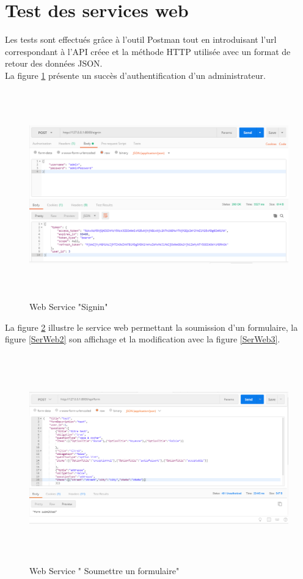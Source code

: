 \section{Test des services web}
Les tests sont effectués grâce à l'outil Postman tout en introduisant l'url correspondant à l'API créee et la méthode HTTP utilisée avec un format de retour des données JSON.\\
La figure \ref{login} présente un succès d'authentification d'un administrateur.
\begin{figure} [H]
    \centering
         \begin{center}
             \includegraphics [width=16cm,height=9cm] {SprintImage/loginSuccess.PNG}
            \caption{Web Service "Signin"}
            \label{login}
        \end{center}
    \end{figure}
    
    La figure \ref{SerWeb1} illustre le service web permettant la soumission d'un formulaire, la figure \ref{SerWeb2} son affichage et la modification avec la figure \ref{SerWeb3}.

    \begin{figure} [H]
    \centering
         \begin{center}
             \includegraphics [width=16cm,height=9cm] {SprintImage/FormSubmitted.png}
            \caption{Web Service " Soumettre un formulaire"}
            \label{SerWeb1}
        \end{center}
    \end{figure}
    
